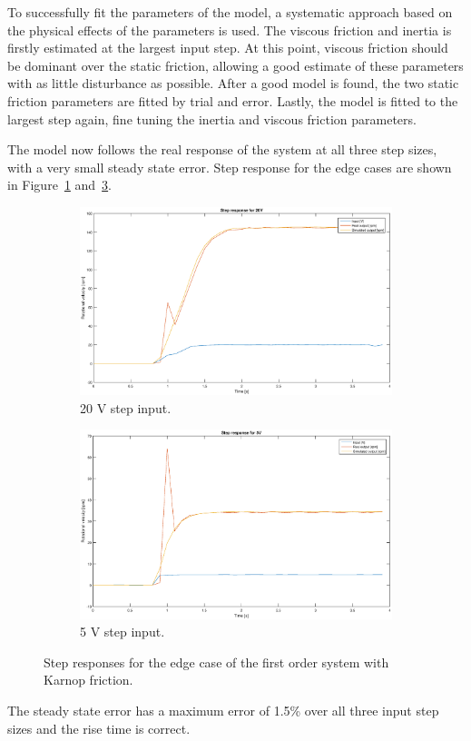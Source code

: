 To successfully fit the parameters of the model, a systematic approach based on
the physical effects of the parameters is used. The viscous friction and inertia 
is firstly estimated at the largest input step. At this point, viscous friction
should be dominant over the static friction, allowing a good estimate of these
parameters with as little disturbance as possible. After a good model is found,
the two static friction parameters are fitted by trial and error. Lastly, the
model is fitted to the largest step again, fine tuning the inertia and viscous
friction parameters.

The model now follows the real response of the system at all three step sizes,
with a very small steady state error. Step response for the edge cases are shown
in Figure~\ref{fig:20vkarnop} and~\ref{fig:5vkarnop}.
\begin{figure}[H]
    \centering
    \begin{subfigure}[H]{0.48\textwidth}
    \label{fig:20vkarnop}
    \includegraphics[width=\textwidth]{./img/testrig_20Vstep_no_i_fric.eps}
    \caption{20 V step input.}
    \end{subfigure}
    \begin{subfigure}[H]{0.48\textwidth}
    \label{fig:5vkarnop}
    \includegraphics[width=\textwidth]{./img/testrig_5Vstep_no_i_fric.eps}
    \caption{5 V step input.}
    \end{subfigure}
    \caption{Step responses for the edge case of the first order system with
    Karnop friction.}
\end{figure}
The steady state error has a maximum error of 1.5\% over all three input step
sizes and the rise time is correct. %


